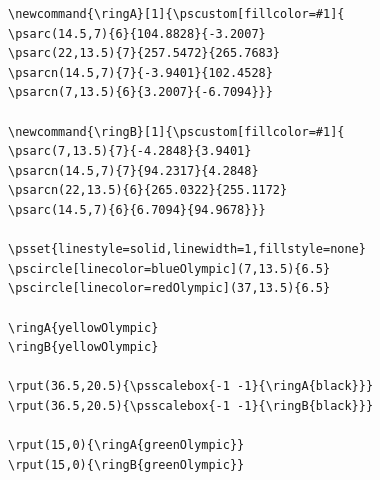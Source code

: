 \documentclass{ammTalk}
\begin{document}
\listingsTeX%
%
\newsavebox{\mybox}
\begin{lrbox}{\mybox}%
\begin{lstlisting}
\newcommand{\ringA}[1]{\pscustom[fillcolor=#1]{
\psarc(14.5,7){6}{104.8828}{-3.2007}
\psarc(22,13.5){7}{257.5472}{265.7683}
\psarcn(14.5,7){7}{-3.9401}{102.4528}
\psarcn(7,13.5){6}{3.2007}{-6.7094}}}

\newcommand{\ringB}[1]{\pscustom[fillcolor=#1]{
\psarc(7,13.5){7}{-4.2848}{3.9401}
\psarcn(14.5,7){7}{94.2317}{4.2848}
\psarcn(22,13.5){6}{265.0322}{255.1172}
\psarc(14.5,7){6}{6.7094}{94.9678}}}

\psset{linestyle=solid,linewidth=1,fillstyle=none}
\pscircle[linecolor=blueOlympic](7,13.5){6.5}
\pscircle[linecolor=redOlympic](37,13.5){6.5}

\ringA{yellowOlympic}
\ringB{yellowOlympic}

\rput(36.5,20.5){\psscalebox{-1 -1}{\ringA{black}}}
\rput(36.5,20.5){\psscalebox{-1 -1}{\ringB{black}}}

\rput(15,0){\ringA{greenOlympic}}
\rput(15,0){\ringB{greenOlympic}}
\end{lstlisting}%
\end{lrbox}%
\begin{figure}[!h]
\centering\vspace{-5mm}%
%
\end{figure}
\newcommand{\makeLogo}[4][0]{\slideTitle{#2}
\begin{figure}[!h]
\centering\vspace{-5mm}%
\resizebox{0.98\textwidth}{!}{%
\begin{pspicture}(0,0)(17,9)%
\psSet{iconWidth=70}%
\rput{#1}(8.5,4.5){#3}%
#4%
%
\end{pspicture}}%
\end{figure}
}
\end{document}
